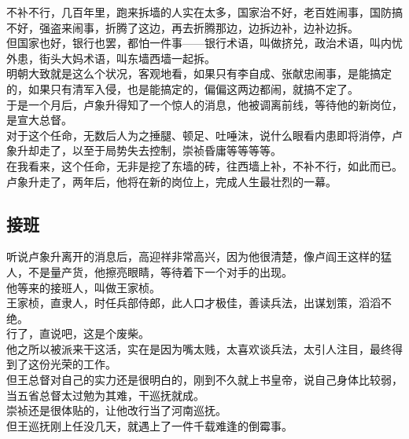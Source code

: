 \begin{multicols}{\theparacolNo}
不补不行，几百年里，跑来拆墙的人实在太多，国家治不好，老百姓闹事，国防搞不好，强盗来闹事，折腾了这边，再去折腾那边，边拆边补，边补边拆。\\

但国家也好，银行也罢，都怕一件事——银行术语，叫做挤兑，政治术语，叫内忧外患，街头大妈术语，叫东墙西墙一起拆。\\

明朝大致就是这么个状况，客观地看，如果只有李自成、张献忠闹事，是能搞定的，如果只有清军入侵，也是能搞定的，偏偏这两边都闹，就搞不定了。\\

于是一个月后，卢象升得知了一个惊人的消息，他被调离前线，等待他的新岗位，是宣大总督。\\

对于这个任命，无数后人为之捶腿、顿足、吐唾沫，说什么眼看内患即将消停，卢象升却走了，以至于局势失去控制，崇祯昏庸等等等等。\\

在我看来，这个任命，无非是挖了东墙的砖，往西墙上补，不补不行，如此而已。\\

卢象升走了，两年后，他将在新的岗位上，完成人生最壮烈的一幕。\\

\subsection{接班}
听说卢象升离开的消息后，高迎祥非常高兴，因为他很清楚，像卢阎王这样的猛人，不是量产货，他擦亮眼睛，等待着下一个对手的出现。\\

他等来的接班人，叫做王家桢。\\

王家桢，直隶人，时任兵部侍郎，此人口才极佳，善读兵法，出谋划策，滔滔不绝。\\

行了，直说吧，这是个废柴。\\

他之所以被派来干这活，实在是因为嘴太贱，太喜欢谈兵法，太引人注目，最终得到了这份光荣的工作。\\

但王总督对自己的实力还是很明白的，刚到不久就上书皇帝，说自己身体比较弱，当五省总督太过勉为其难，干巡抚就成。\\

崇祯还是很体贴的，让他改行当了河南巡抚。\\

但王巡抚刚上任没几天，就遇上了一件千载难逢的倒霉事。\\


\end{multicols}
